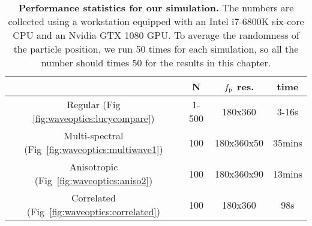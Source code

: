 \begin{table}[!ht]
	\centering
	\addtolength{\tabcolsep}{5pt}
    \caption[Performance statistics for our simulation]{\label{fig:waveoptics:time}
        \textbf{Performance statistics for our simulation.}
		The numbers are collected using a workstation equipped with an Intel i7-6800K six-core CPU and an Nvidia GTX 1080 GPU.
		To average the randomness of the particle position, we run 50 times for each simulation, so all the number should times 50 for the results in this chapter.
    }
    \begin{tabular}{cccc}
                                                               & N     & $f_\mathrm{p}$ res.    & time   \\
    \hline
    Regular (Fig \ref{fig:waveoptics:lucycompare})             & 1-500 &  180x360         & 3-16s  \\
    Multi-spectral (Fig~\ref{fig:waveoptics:multiwave1})       & 100   &  180x360x50      & 35mins \\
    Anisotropic (Fig~\ref{fig:waveoptics:aniso2})              & 100   &  180x360x90      & 13mins \\
    Correlated (Fig~\ref{fig:waveoptics:correlated})           & 100   &  180x360         & 98s    \\
    \end{tabular}
\end{table}
